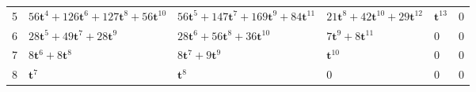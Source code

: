 \begin{tabular}{c|>{\raggedright\arraybackslash}p{4.0cm}>{\raggedright\arraybackslash}p{4.0cm}>{\raggedright\arraybackslash}p{4.0cm}>{\raggedright\arraybackslash}p{4.0cm}>{\raggedright\arraybackslash}p{4.0cm}}
5 & $56\mathbf{t}^{4}+126\mathbf{t}^{6}+127\mathbf{t}^{8}+56\mathbf{t}^{10}$ & $56\mathbf{t}^{5}+147\mathbf{t}^{7}+169\mathbf{t}^{9}+84\mathbf{t}^{11}$ & $21\mathbf{t}^{8}+42\mathbf{t}^{10}+29\mathbf{t}^{12}$ & $\mathbf{t}^{13}$ & $0$ \\
6 & $28\mathbf{t}^{5}+49\mathbf{t}^{7}+28\mathbf{t}^{9}$ & $28\mathbf{t}^{6}+56\mathbf{t}^{8}+36\mathbf{t}^{10}$ & $7\mathbf{t}^{9}+8\mathbf{t}^{11}$ & $0$ & $0$ \\
7 & $8\mathbf{t}^{6}+8\mathbf{t}^{8}$ & $8\mathbf{t}^{7}+9\mathbf{t}^{9}$ & $\mathbf{t}^{10}$ & $0$ & $0$ \\
8 & $\mathbf{t}^{7}$ & $\mathbf{t}^{8}$ & $0$ & $0$ & $0$ \\
\hline
\end{tabular}
